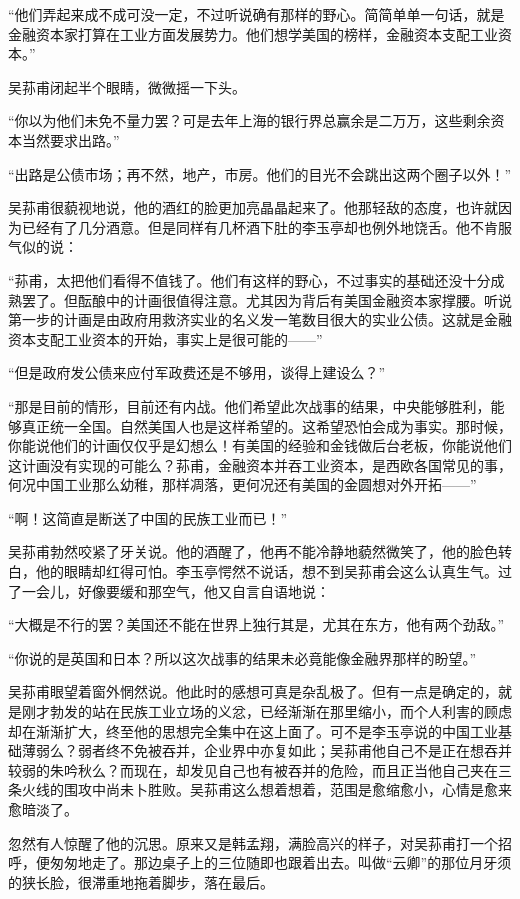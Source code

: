 \par “他们弄起来成不成可没一定，不过听说确有那样的野心。简简单单一句话，就是金融资本家打算在工业方面发展势力。他们想学美国的榜样，金融资本支配工业资本。”
\par 吴荪甫闭起半个眼睛，微微摇一下头。
\par “你以为他们未免不量力罢？可是去年上海的银行界总赢余是二万万，这些剩余资本当然要求出路。”
\par “出路是公债市场；再不然，地产，市房。他们的目光不会跳出这两个圈子以外！”
\par 吴荪甫很藐视地说，他的酒红的脸更加亮晶晶起来了。他那轻敌的态度，也许就因为已经有了几分酒意。但是同样有几杯酒下肚的李玉亭却也例外地饶舌。他不肯服气似的说：
\par “荪甫，太把他们看得不值钱了。他们有这样的野心，不过事实的基础还没十分成熟罢了。但酝酿中的计画很值得注意。尤其因为背后有美国金融资本家撑腰。听说第一步的计画是由政府用救济实业的名义发一笔数目很大的实业公债。这就是金融资本支配工业资本的开始，事实上是很可能的——”
\par “但是政府发公债来应付军政费还是不够用，谈得上建设么？”
\par “那是目前的情形，目前还有内战。他们希望此次战事的结果，中央能够胜利，能够真正统一全国。自然美国人也是这样希望的。这希望恐怕会成为事实。那时候，你能说他们的计画仅仅乎是幻想么！有美国的经验和金钱做后台老板，你能说他们这计画没有实现的可能么？荪甫，金融资本并吞工业资本，是西欧各国常见的事，何况中国工业那么幼稚，那样凋落，更何况还有美国的金圆想对外开拓——”
\par “啊！这简直是断送了中国的民族工业而已！”
\par 吴荪甫勃然咬紧了牙关说。他的酒醒了，他再不能冷静地藐然微笑了，他的脸色转白，他的眼睛却红得可怕。李玉亭愕然不说话，想不到吴荪甫会这么认真生气。过了一会儿，好像要缓和那空气，他又自言自语地说：
\par “大概是不行的罢？美国还不能在世界上独行其是，尤其在东方，他有两个劲敌。”
\par “你说的是英国和日本？所以这次战事的结果未必竟能像金融界那样的盼望。”
\par 吴荪甫眼望着窗外惘然说。他此时的感想可真是杂乱极了。但有一点是确定的，就是刚才勃发的站在民族工业立场的义忿，已经渐渐在那里缩小，而个人利害的顾虑却在渐渐扩大，终至他的思想完全集中在这上面了。可不是李玉亭说的中国工业基础薄弱么？弱者终不免被吞并，企业界中亦复如此；吴荪甫他自己不是正在想吞并较弱的朱吟秋么？而现在，却发见自己也有被吞并的危险，而且正当他自己夹在三条火线的围攻中尚未卜胜败。吴荪甫这么想着想着，范围是愈缩愈小，心情是愈来愈暗淡了。
\par 忽然有人惊醒了他的沉思。原来又是韩孟翔，满脸高兴的样子，对吴荪甫打一个招呼，便匆匆地走了。那边桌子上的三位随即也跟着出去。叫做“云卿”的那位月牙须的狭长脸，很滞重地拖着脚步，落在最后。
